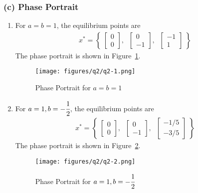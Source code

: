 \subsubsection*{(c) Phase Portrait}

\begin{enumerate}[label= (\roman*)]
    \item For \( a = b = 1 \), the equilibrium points are
          \begin{align*}
              x^* =
              \left \{ \;
              \begin{bmatrix}
                  0 \\
                  0
              \end{bmatrix}, \; \;
              \begin{bmatrix}
                  0 \\
                  -1
              \end{bmatrix}, \; \;
              \begin{bmatrix}
                  -1 \\
                  1
              \end{bmatrix} \;
              \right \}
          \end{align*}
          The phase portrait is shown in Figure~\ref{fig:q2-1}.
          \begin{figure}[!ht]
              \centering
              \texttt{[image: figures/q2/q2-1.png]}
              \vspace*{-2.5em}
              \caption{
                  Phase Portrait for \( a = b = 1 \)
              }\label{fig:q2-1}
          \end{figure}

    \item For \( a = 1, b = -\cfrac{1}{2} \), the equilibrium points are
          \begin{align*}
              x^* =
              \left \{ \;
              \begin{bmatrix}
                  0 \\
                  0
              \end{bmatrix}, \; \;
              \begin{bmatrix}
                  0 \\
                  -1
              \end{bmatrix}, \; \;
              \begin{bmatrix}
                  -1/5 \\
                  -3/5
              \end{bmatrix} \;
              \right \}
          \end{align*}
          The phase portrait is shown in Figure~\ref{fig:q2-2}.
          \begin{figure}[!ht]
              \centering
              \texttt{[image: figures/q2/q2-2.png]}
              \vspace*{-2.5em}
              \caption{
                  Phase Portrait for \( a = 1, b = -\cfrac{1}{2} \)
              }\label{fig:q2-2}
          \end{figure}
\end{enumerate}
